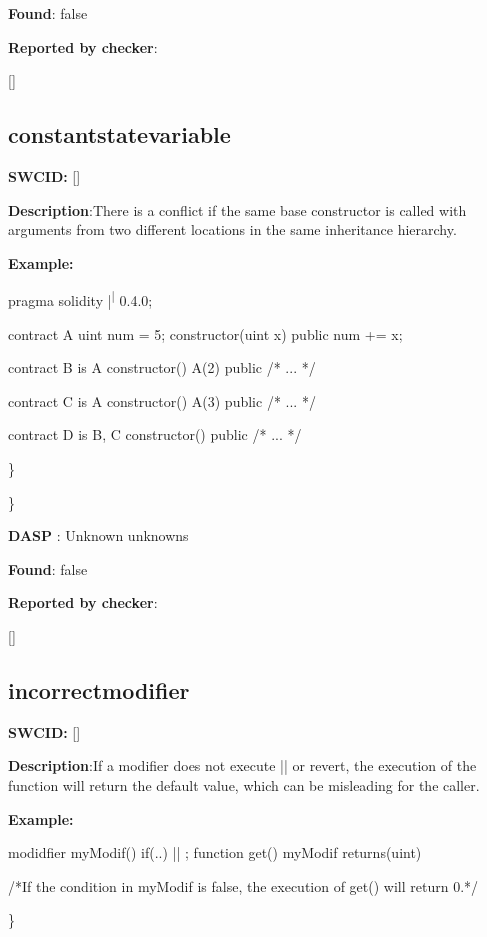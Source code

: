 \documentclass{article}
\begin{document}
\textbf{Found}: false

\textbf{Reported by checker}: 
\begin{ffcode} 

[]
\end{ffcode} 
\subsection{constant{\textunderscore}state{\textunderscore}variable} 
\textbf{SWC{\textunderscore}ID:} []

\textbf{Description}:There is a conflict if the same base constructor is called with arguments from two different locations in the same inheritance hierarchy.


\textbf{Example:} 
\begin{ffcode} 

pragma solidity |\textsuperscript| 0.4.0;

contract A{
    uint num = 5;
    constructor(uint x) public{
        num += x;
    }
}

contract B is A{
    constructor() A(2) public { /* ... */ }
}

contract C is A {
    constructor() A(3) public { /* ... */ }
}

contract D is B, C {
    constructor() public { /* ... */ }
}

\end{ffcode} 
\} 

\} 

\textbf{DASP} : Unknown unknowns

\textbf{Found}: false

\textbf{Reported by checker}: 
\begin{ffcode} 

[]
\end{ffcode} 
\subsection{incorrect{\textunderscore}modifier} 
\textbf{SWC{\textunderscore}ID:} []

\textbf{Description}:If a modifier does not execute |\textunderscore|  or revert, the execution of the function will return the default value, which can be misleading for the caller.


\textbf{Example:} 
\begin{ffcode} 

modidfier myModif(){
    if(..){
      |\textunderscore| ;
    }
}
function get() myModif returns(uint){}

 /*If the condition in myModif is false, the execution of get() will return 0.*/ 

\end{ffcode} 
\} 
\end{document}
